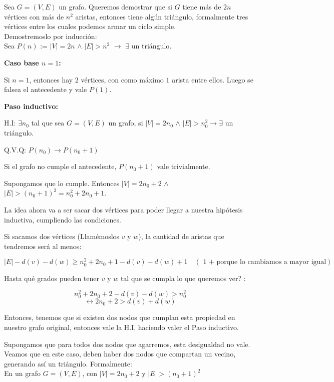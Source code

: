 \documentclass{article}
\begin{document}
Sea $G = (V,E)$ un grafo. Queremos demostrar que si $G$ tiene más de $2n$ vértices con más de $n^2$ aristas, entonces tiene algún triángulo, formalmente tres vértices entre los cuales podemos armar un ciclo simple.\\

Demostremoslo por inducción:\\

Sea $P(n)$ := $|V| = 2n$ $\land$ $|E| > n^2$ $\rightarrow$ $\exists$ un triángulo.

\textbf{Caso base $n = 1$:}

Si $n = 1$, entonces hay $2$ vértices, con como máximo $1$ arista entre ellos. Luego se falsea el antecedente y vale $P(1)$.

\textbf{Paso inductivo:}

H.I: $\exists n_0$ tal que sea $G = (V,E)$ un grafo, si $|V| = 2n_0$ $\land$ $|E| > n_0^2 \rightarrow \exists$ un triángulo.

Q.V.Q: $P(n_0) \rightarrow P(n_0 + 1)$

Si el grafo no cumple el antecedente, $P(n_0 + 1)$ vale trivialmente.

Supongamos que lo cumple. Entonces $|V| = 2n_0 + 2$ $\land$ $|E| > (n_0 + 1)^2 = n_0^2 + 2n_0 + 1$.

La idea ahora va a ser sacar dos vértices para poder llegar a nuestra hipótesis inductiva, cumpliendo las condiciones.

Si sacamos dos vértices (Llamémoslos $v$ y $w$), la cantidad de aristas que tendremos será al menos: 

\[
|E| - d(v) - d(w) \geq n_0^2 + 2n_0 + 1  - d(v) - d(w) + 1 \quad (\text{ 1 + porque lo cambiamos a mayor igual})
\]

Hasta qué grados pueden tener $v$ y $w$ tal que se cumpla lo que queremos ver? :

\[
n_0^2 + 2n_0 + 2 - d(v) - d(w) > n_0^2   
\]
\[
 \leftrightarrow  2n_0 + 2 > d(v) + d(w)
\]

Entonces, tenemos que si existen dos nodos que cumplan esta propiedad en nuestro grafo original, entonces vale la H.I, haciendo valer el Paso inductivo.

Supongamos que para todos dos nodos que agarremos, esta desigualdad no vale. Veamos que en este caso, deben haber dos nodos que compartan un vecino, generando así un triángulo. Formalmente:\\

En un grafo \( G = (V,E) \), con \( |V| = 2n_0 + 2 \) y \( |E| > (n_0 + 1)^2 \)
\end{document}

